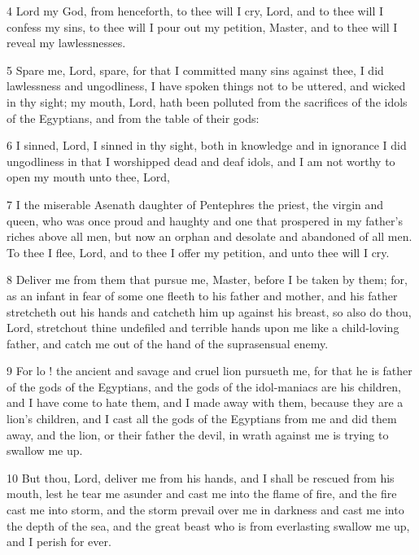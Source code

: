\par 4 Lord my God, from henceforth, to thee will I cry, Lord, 
and to thee will I confess my sins, to thee will I pour out my petition, Master, 
and to thee will I reveal my lawlessnesses. 

\par 5 Spare me, Lord, spare, for that I committed many sins against thee, 
I did lawlessness and ungodliness, 
I have spoken things not to be uttered, and wicked in thy sight; 
my mouth, Lord, hath been polluted from the sacrifices of the idols of the Egyptians, 
and from the table of their gods: 

\par 6 I sinned, Lord, I sinned in thy sight, both in knowledge and in ignorance 
I did ungodliness in that I worshipped dead and deaf idols, 
and I am not worthy to open my mouth unto thee, Lord, 

\par 7 I the miserable Asenath daughter of Pentephres the priest, the virgin and queen, 
who was once proud and haughty and one that prospered in my father's riches above all men, 
but now an orphan and desolate and abandoned of all men. 
To thee I flee, Lord, and to thee I offer my petition, 
and unto thee will I cry. 

\par 8 Deliver me from them that pursue me, Master, before I be taken by them; 
for, as an infant in fear of some one fleeth to his father and mother, 
and his father stretcheth out his hands and catcheth him up against his breast, 
so also do thou, Lord, stretchout thine undefiled and terrible hands upon me like a child-loving father, 
and catch me out of the hand of the suprasensual enemy. 

\par 9 For lo ! the ancient and savage and cruel lion pursueth me, 
for that he is father of the gods of the Egyptians, 
and the gods of the idol-maniacs are his children, 
and I have come to hate them, and I made away with them, 
because they are a lion's children, 
and I cast all the gods of the Egyptians from me and did them away, 
and the lion, or their father the devil, in wrath against me is trying to swallow me up. 

\par 10 But thou, Lord, deliver me from his hands, 
and I shall be rescued from his mouth, 
lest he tear me asunder and cast me into the flame of fire, 
and the fire cast me into storm, 
and the storm prevail over me in darkness and cast me into the depth of the sea, 
and the great beast who is from everlasting swallow me up, 
and I perish for ever. 

